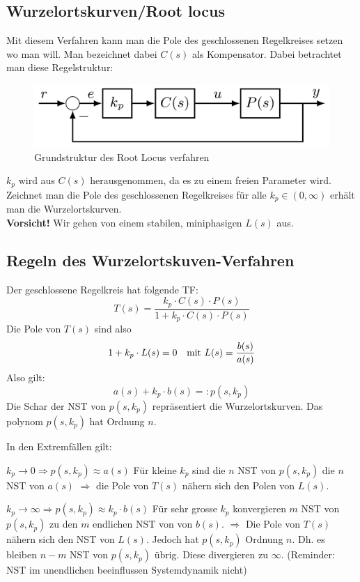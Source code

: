 \subsection{Wurzelortskurven/Root locus}
    Mit diesem Verfahren kann man die Pole des geschlossenen Regelkreises setzen wo man will. Man bezeichnet dabei $C(s)$ als Kompensator. Dabei betrachtet man diese Regelstruktur:
    \begin{figure}[H]
        \centering
        \includegraphics[width = 0.5\linewidth]{images/04/RL_sys.jpeg}
        \caption{Grundstruktur des Root Locus verfahren}
    \end{figure}
    $k_p$ wird aus $C(s)$ herausgenommen, da es zu einem freien Parameter wird. Zeichnet man die Pole des geschlossenen Regelkreises für alle $k_p \in(0,\infty)$ erhält man die Wurzelortskurven.
    \\\textbf{Vorsicht!} Wir gehen von einem stabilen, miniphasigen $L(s)$ aus.
    
\subsection{Regeln des Wurzelortskuven-Verfahren}
    Der geschlossene Regelkreis hat folgende TF:
    \begin{equation*}
        T(s) = \frac{k_p\cdot C(s)\cdot P(s)}{1 + k_p\cdot C(s)\cdot P(s)}
    \end{equation*}
    Die Pole von $T(s)$ sind also
    \begin{equation*}
        1 + k_p\cdot L(s) = 0 \quad\textnormal{mit } L(s) = \frac{b(s)}{a(s)} 
    \end{equation*}
    Also gilt:
    \begin{equation*}
        a(s) + k_p\cdot b(s) =: p(s,k_p)
    \end{equation*}
    Die Schar der NST von $p(s,k_p)$ repräsentiert die Wurzelortskurven. Das polynom $p(s,k_p)$ hat Ordnung $n$.
    
    In den Extremfällen gilt:
    
    $\boxed{k_p \rightarrow 0 \Rightarrow p(s,k_p) \approx a(s)}$ Für kleine $k_p$ sind die $n$ NST von $p(s,k_p)$ die $n$ NST von $a(s)$ $\Rightarrow$ die Pole von $T(s)$ nähern sich den Polen von $L(s)$.
    
    $\boxed{k_p \rightarrow \infty \Rightarrow p(s,k_p) \approx k_p\cdot b(s)}$ Für sehr grosse $k_p$ konvergieren $m$ NST von $p(s,k_p)$ zu den $m$ endlichen NST von von $b(s)$. $\Rightarrow$ Die Pole von $T(s)$ nähern sich den NST von $L(s)$. Jedoch hat $p(s,k_p)$ Ordnung $n$. Dh. es bleiben $n-m$ NST von $p(s,k_p)$ übrig. Diese divergieren zu $\infty$. (Reminder: NST im unendlichen beeinflussen Systemdynamik nicht)
    

